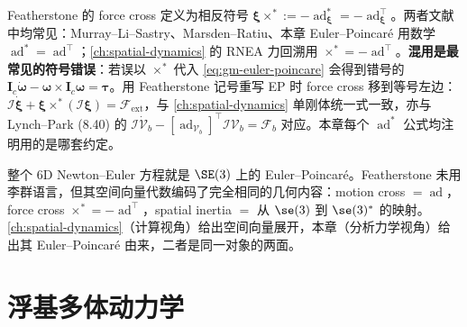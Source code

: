 \begin{pitfall}
Featherstone 的 force cross 定义为相反符号 $\boldsymbol\xi\times^*:=-\operatorname{ad}^*_{\boldsymbol\xi}=-\operatorname{ad}_{\boldsymbol\xi}^\top$。两者文献中均常见：Murray--Li--Sastry、Marsden--Ratiu、本章 Euler--Poincaré 用数学 $\operatorname{ad}^*=\operatorname{ad}^\top$；\cref{ch:spatial-dynamics} 的 RNEA 力回溯用 $\times^*=-\operatorname{ad}^\top$。\textbf{混用是最常见的符号错误}：若误以 $\times^*$ 代入 \cref{eq:gm-euler-poincare} 会得到错号的 $\mathbf I_c\dot{\boldsymbol\omega}-\boldsymbol\omega\times\mathbf I_c\boldsymbol\omega=\boldsymbol\tau$。用 Featherstone 记号重写 EP 时 force cross 移到等号左边：$\boldsymbol{\mathcal I}\dot{\boldsymbol\xi}+\boldsymbol\xi\times^*(\boldsymbol{\mathcal I}\boldsymbol\xi)=\boldsymbol{\mathcal F}_{\mathrm{ext}}$，与 \cref{ch:spatial-dynamics} 单刚体统一式一致，亦与 Lynch--Park (8.40) 的 $\boldsymbol{\mathcal I}\dot{\boldsymbol{\mathcal V}}_b-[\operatorname{ad}_{\boldsymbol{\mathcal V}_b}]^\top\boldsymbol{\mathcal I}\boldsymbol{\mathcal V}_b=\boldsymbol{\mathcal F}_b$ 对应\cite{lynch2017modern}。本章每个 $\operatorname{ad}^*$ 公式均注明用的是哪套约定。
\end{pitfall}

\begin{insight}
整个 $6$D Newton--Euler 方程就是 $\SE(3)$ 上的 Euler--Poincaré。Featherstone 未用李群语言，但其空间向量代数编码了完全相同的几何内容：motion cross $=\operatorname{ad}$，force cross $\times^*=-\operatorname{ad}^\top$，spatial inertia $=$ 从 $\se(3)$ 到 $\se(3)^*$ 的映射。\cref{ch:spatial-dynamics}（计算视角）给出空间向量展开，本章（分析力学视角）给出其 Euler--Poincaré 由来，二者是同一对象的两面。
\end{insight}

\section{浮基多体动力学}
\label{sec:gm-floating-base}

